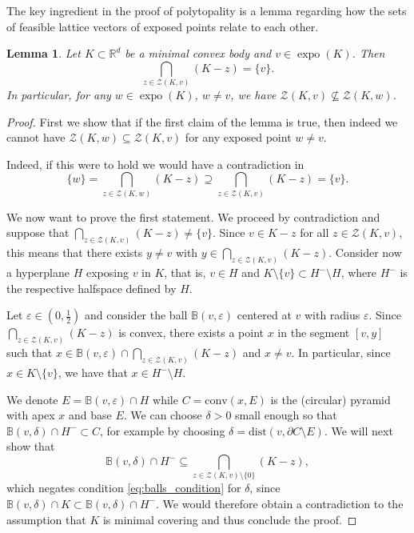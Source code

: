 \documentclass[11pt, a4paper]{amsart}
\newcommand{\orbit}{\mathcal{Z}}
\newcommand{\RR}{\mathbb{R}}
\newcommand{\conv}{\mathrm{conv}}
\newcommand{\dist}{\mathrm{dist}}
\newcommand{\ball}{\mathbb{B}}
\DeclareMathOperator{\expo}{expo}
\numberwithin{equation}{section}
\theoremstyle{plain}
\newtheorem{lemma}[theorem]{Lemma}
\begin{document}
The key ingredient in the proof of polytopality is a lemma regarding how the sets of feasible lattice vectors of exposed points relate to each other.

\begin{lemma}
	\label{lem:orbits}
	Let $K\subset\RR^d$ be a minimal convex body and $v\in \expo(K)$. Then 
		\[
		\bigcap_{z \in \orbit(K,v)} (K-z) = \{v\}.
		\]
	In particular, for any $w \in \expo(K)$, $w\neq v$, we have $\orbit(K,v)\not\subseteq \orbit(K,w)$.	
\end{lemma}

\begin{proof}
	First we show that if the first claim of the lemma is true, then indeed we cannot have  $\orbit(K,w) \subseteq \orbit(K,v)$ for any exposed point $w \neq v$.
	
	Indeed, if this were to hold we would have a contradiction in
	\[
	\{w\} = \bigcap_{z \in \orbit(K,w)} (K-z) \supseteq \bigcap_{z \in \orbit(K,v)} (K-z) = \{v\}.
	\]
	
	We now want to prove the first statement. We proceed by contradiction and suppose that $\bigcap_{z \in \orbit(K,v)} (K-z) \neq \{v\}$. Since $v \in K-z$ for all $z \in \orbit(K,v)$, this means that there exists $y \neq v$ with $y \in \bigcap_{z \in \orbit(K,v)} (K-z)$. Consider now a hyperplane $H$ exposing $v$ in $K$, that is, $v \in H$ and $K \setminus \{v\} \subset H^- \setminus H$, where $H^{-}$ is the respective halfspace defined by $H$.
	

	Let $\varepsilon \in (0,\frac12)$ and consider the ball $\ball(v,\varepsilon)$ centered at $v$ with radius $\varepsilon$. Since $\bigcap_{z \in \orbit(K,v)} (K-z)$ is convex, there exists a point $x$ in the segment $[v,y]$ such that $x \in \ball(v, \varepsilon) \cap \bigcap_{z \in \orbit(K,v)} (K-z)$ and $x \neq v$. In particular, since $x \in K \setminus \{v\}$, we have that $x \in H^- \setminus H$.
	
	We denote $E = \ball(v, \varepsilon) \cap H$ while $C = \conv(x, E)$ is the (circular) pyramid with apex $x$ and base $E$. We can choose $\delta >0 $ small enough so that $\ball(v, \delta) \cap H^- \subset C$, for example by choosing $\delta = \dist(v, \partial C \setminus E)$.
	We will next show that
	\begin{equation}
	\label{eq:cone_covering}
	\ball(v, \delta)\cap H^- \subseteq \bigcap_{z \in \orbit(K,v) \setminus \{0\}} (K-z),
	\end{equation}
	which negates condition \eqref{eq:balls_condition} for $\delta$, since  $\ball(v, \delta)\cap K \subset \ball(v, \delta)\cap H^-$. We would therefore obtain a contradiction to the assumption that $K$ is minimal covering and thus conclude the proof.
	

\end{proof}
\end{document}
